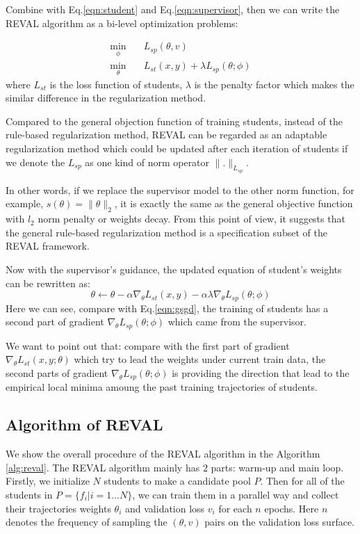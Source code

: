 \documentclass[english]{sobraep}
\begin{document}
Combine with Eq.\ref{eqn:student} and Eq.\ref{eqn:supervisor}, then we can write the REVAL algorithm as a bi-level optimization problems:

\begin{align} \label{eqn:reval}
    \min \limits_{\phi} \quad &L_{sp}(\theta, v) \\
    \min \limits_{\theta} \quad &L_{st}(x,y) + \lambda L_{sp}(\theta; \phi)
\end{align}
where $L_{st}$ is the loss function of students, $\lambda$ is the penalty factor which makes the similar difference in the regularization method. 

Compared to the general objection function of training students, instead of the rule-based regularization method, REVAL can be regarded as an adaptable regularization method which could be updated after each iteration of students if we denote the $L_{sp}$ as one kind of norm operator $\|.\|_{L_{sp}}$. 

In other words, if we replace the supervisor model to the other norm function, for example, $s(\theta) = \| \theta \|_2$, it is exactly the same as the general objective function with $l_2$ norm penalty or weights decay. From this point of view, it suggests that the general rule-based regularization method is a specification subset of the REVAL framework. 

Now with the supervisor's guidance, the updated equation of student's weights can be rewritten as:
\begin{equation}\label{eqn:reval_sgd}
    \theta \xleftarrow{} \theta  - \alpha\nabla_{\theta}L_{st}(x,y) - \alpha \lambda\nabla_{\theta} L_{sp}(\theta; \phi)
\end{equation}
Here we can see, compare with Eq.\ref{eqn:gsgd}, the training of students has a second part of gradient $\nabla_{\theta} L_{sp}(\theta; \phi)$ which came from the supervisor. 

We want to point out that: compare with the first part of gradient $\nabla_{\theta}L_{st}(x,y;\theta)$ which try to lead the weights under current train data, the second parts of gradient $\nabla_{\theta} L_{sp}(\theta; \phi)$ is providing the direction that lead to the empirical local minima amoung the past training trajectories of students.

\subsection{Algorithm of REVAL}

We show the overall procedure of the REVAL algorithm in the Algorithm \ref{alg:reval}. The REVAL algorithm mainly has $2$ parts: warm-up and main loop. Firstly, we initialize $N$ students to make a candidate pool $P$. Then for all of the students in $P=\{f_i|i=1...N\}$, we can train them in a parallel way and collect their trajectories weights $\theta_i$ and validation loss $v_i$ for each $n$ epochs. Here $n$ denotes the frequency of sampling the $(\theta, v)$ pairs on the validation loss surface. 
\end{document}
